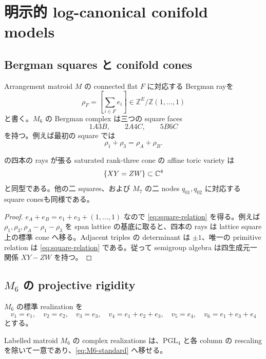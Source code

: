 \documentclass[11pt,a4paper]{ltjsarticle}
\newcommand{\ZZ}{\mathbb Z}\newcommand{\dd}{\mathrm d}\newcommand{\Ric}{\operatorname{Ric}}
\theoremstyle{plain}
\theoremstyle{definition}
\theoremstyle{remark}
\begin{document}
\section{明示的 log-canonical conifold models}\label{sec:algebraic}

\subsection{Bergman squares と conifold cones}
Arrangement matroid $M$ の connected flat $F$ に対応する Bergman rayを~\cite{FS,HKT}
\[
 \rho_F=\left[\sum_{i\in F}e_i\right]\in\ZZ^E/\ZZ(1,\dots,1)
\]
と書く。$M_6$ の Bergman complex は三つの square faces
\[
 1A3B,\qquad 2A4C,\qquad 5B6C
\]
を持つ。例えば最初の square では
\begin{equation}\label{eq:square-relation}
 \rho_1+\rho_3=\rho_A+\rho_B.
\end{equation}

\begin{proposition}\label{prop:square-is-conifold}
 の四本の rays が張る saturated rank-three cone の affine toric variety は
\[
 \{XY=ZW\}\subset\mathbb C^4
\]
と同型である。他の二 squares、および $M_7$ の二 nodes $q_{01},q_{02}$ に対応する square conesも同様である。
\end{proposition}

\begin{proof}
$e_A+e_B=e_1+e_3+(1,\dots,1)$ なので \cref{eq:square-relation} を得る。例えば $\rho_1,\rho_3,\rho_A-\rho_1-\rho_3$ を span lattice の基底に取ると、四本の rays は lattice square 上の標準 cone へ移る。Adjacent triples の determinant は $\pm1$、唯一の primitive relation は \cref{eq:square-relation} である。従って semigroup algebra は四生成元一関係 $XY-ZW$ を持つ。
\end{proof}

\subsection{\texorpdfstring{$M_6$}{M6} の projective rigidity}
$M_6$ の標準 realization を
\begin{equation}\label{eq:M6-standard}
 v_1=e_1,\quad v_2=e_2,\quad v_3=e_3,\quad
 v_4=e_1+e_2+e_3,\quad v_5=e_4,\quad v_6=e_1+e_3+e_4
\end{equation}
とする。

\begin{proposition}\label{prop:M6-rigidity}
Labelled matroid $M_6$ の complex realizations は、$\mathrm{PGL}_4$ と各 column の rescaling を除いて一意であり、\cref{eq:M6-standard} へ移せる。
\end{proposition}
\end{document}
